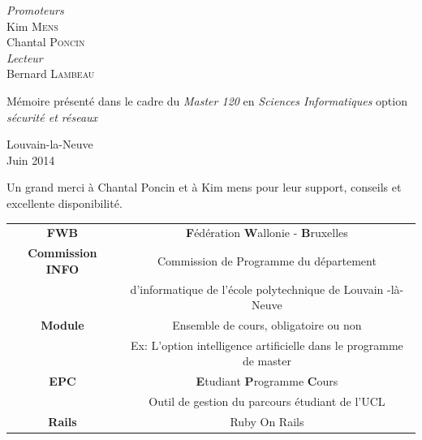 \documentclass[11pt,a4paper,twoside]{book}
\begin{document}
\begin{titlepage}
\begin{center}
\begin{minipage}{0.4\textwidth}
\begin{flushleft} \large
\emph{Promoteurs}\\Kim \textsc{Mens}\\
Chantal \textsc{Poncin}\\
\emph{Lecteur}\\Bernard \textsc{Lambeau}\\
\end{flushleft}
\end{minipage}
\begin{minipage}{0.4\textwidth}
\begin{flushright} \large
Mémoire présenté dans le cadre du \emph{Master 120} en \emph{Sciences Informatiques} option \emph{sécurité et réseaux}
\end{flushright}
\end{minipage}
\vfill
Louvain-la-Neuve\\
{\large Juin 2014}
\end{center}
\end{titlepage}
\newpage
\vspace*{\fill}
\begin{center}
\begin{minipage}{0.4\textwidth}
\begin{flushright} \large
Un grand merci à Chantal Poncin et à Kim mens pour leur support, conseils et excellente disponibilité.
\end{flushright}
\end{minipage}
\end{center}
\vspace*{\fill}

\tableofcontents
%

\clearpage
{} 

\begin{longtable}{c c}

\textbf{FWB} & \textbf{F}édération \textbf{W}allonie - \textbf{B}ruxelles\\
\textbf{Commission INFO} & Commission de Programme du département\\ 
&d'informatique de l'école polytechnique de Louvain -là-Neuve\\
\textbf{Module} & Ensemble de cours, obligatoire ou non\\
& Ex: L'option intelligence artificielle dans le programme de master\\
\textbf{EPC} & \textbf{E}tudiant \textbf{P}rogramme \textbf{C}ours\\
&Outil de gestion du parcours étudiant de l’UCL\\
\textbf{Rails} & Ruby On Rails\\
\end{longtable}
\end{document}
